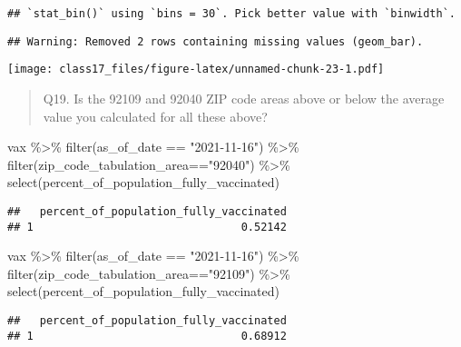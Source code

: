 \documentclass[
]{article}
\newenvironment{Shaded}{\begin{snugshade}}{\end{snugshade}}
\newcommand{\FunctionTok}[1]{\textcolor[rgb]{0.00,0.00,0.00}{#1}}
\newcommand{\NormalTok}[1]{#1}
\newcommand{\SpecialCharTok}[1]{\textcolor[rgb]{0.00,0.00,0.00}{#1}}
\newcommand{\StringTok}[1]{\textcolor[rgb]{0.31,0.60,0.02}{#1}}
\begin{document}
\begin{verbatim}
## `stat_bin()` using `bins = 30`. Pick better value with `binwidth`.
\end{verbatim}

\begin{verbatim}
## Warning: Removed 2 rows containing missing values (geom_bar).
\end{verbatim}

\texttt{[image: class17\_files/figure-latex/unnamed-chunk-23-1.pdf]}

\begin{quote}
Q19. Is the 92109 and 92040 ZIP code areas above or below the average
value you calculated for all these above?
\end{quote}

\begin{Shaded}
\begin{Highlighting}[]
\NormalTok{vax }\SpecialCharTok{\%\textgreater{}\%} \FunctionTok{filter}\NormalTok{(as\_of\_date }\SpecialCharTok{==} \StringTok{"2021{-}11{-}16"}\NormalTok{) }\SpecialCharTok{\%\textgreater{}\%}  
  \FunctionTok{filter}\NormalTok{(zip\_code\_tabulation\_area}\SpecialCharTok{==}\StringTok{"92040"}\NormalTok{) }\SpecialCharTok{\%\textgreater{}\%}
  \FunctionTok{select}\NormalTok{(percent\_of\_population\_fully\_vaccinated)}
\end{Highlighting}
\end{Shaded}

\begin{verbatim}
##   percent_of_population_fully_vaccinated
## 1                                0.52142
\end{verbatim}

\begin{Shaded}
\begin{Highlighting}[]
\NormalTok{vax }\SpecialCharTok{\%\textgreater{}\%} \FunctionTok{filter}\NormalTok{(as\_of\_date }\SpecialCharTok{==} \StringTok{"2021{-}11{-}16"}\NormalTok{) }\SpecialCharTok{\%\textgreater{}\%}  
  \FunctionTok{filter}\NormalTok{(zip\_code\_tabulation\_area}\SpecialCharTok{==}\StringTok{"92109"}\NormalTok{) }\SpecialCharTok{\%\textgreater{}\%}
  \FunctionTok{select}\NormalTok{(percent\_of\_population\_fully\_vaccinated)}
\end{Highlighting}
\end{Shaded}

\begin{verbatim}
##   percent_of_population_fully_vaccinated
## 1                                0.68912
\end{verbatim}
\end{document}
